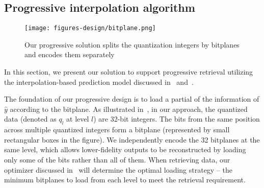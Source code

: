 
\subsection{Progressive interpolation algorithm}
\label{sec: design progressive}

\begin{figure}[ht]
    \centering
    \hspace{-6mm}
    \texttt{[image: figures-design/bitplane.png]} 
    \vspace{-5mm}
    \caption{Our progressive solution splits the quantization integers by bitplanes and encodes them separately} %
    \label{fig:overwrite} %
\end{figure}





In this section, we present our solution to support progressive retrieval utilizing the interpolation-based prediction model discussed in~ and~.


The foundation of our progressive design is to load a partial of the information of $\hat y$ according to the bitplane. As illustrated in~, in our approach, the quantized data (denoted as $q_l$ at level $l$) are 32-bit integers. The bits from the same position across multiple quantized integers form a bitplane (represented by small rectangular boxes in the figure). We independently encode the 32 bitplanes at the same level, which allows lower-fidelity outputs to be reconstructed by loading only some of the bits rather than all of them.
When retrieving data, our optimizer discussed in~ will determine the optimal loading strategy -- the minimum bitplanes to load from each level to meet the retrieval requirement. 



